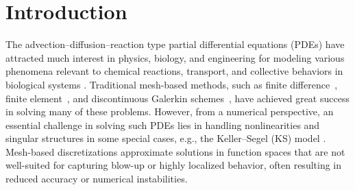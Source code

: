 \documentclass[preprint,12pt]{elsarticle}
\theoremstyle{definition}
\theoremstyle{remark}
\begin{document}
\begin{frontmatter}


\begin{keyword}



\end{keyword}

\end{frontmatter}



\section{Introduction}
The advection--diffusion--reaction type partial differential equations (PDEs) have attracted much interest in physics, biology, and engineering for modeling various phenomena relevant to chemical reactions, transport, and collective behaviors in biological systems \cite{hundsdorfer2013numerical}. Traditional mesh-based methods, such as finite difference~\cite{hoff1978stability}, finite element~\cite{codina1998comparison}, and discontinuous Galerkin schemes~\cite{ayuso2009discontinuous,xia2009application}, have achieved great success in solving many of these problems. However, from a numerical perspective, an essential challenge in solving such PDEs lies in handling nonlinearities and singular structures in some special cases, e.g., the Keller--Segel (KS) model \cite{keller1970initiation}.  
Mesh-based discretizations approximate solutions in function spaces that are not well-suited for capturing blow-up or highly localized behavior, often resulting in reduced accuracy or numerical instabilities.
\end{document}
